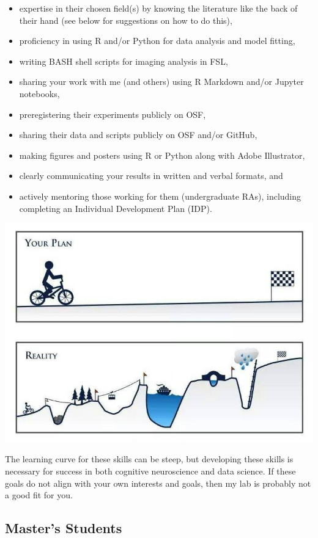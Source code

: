 \documentclass[
]{book}
\providecommand{\tightlist}{%
  \setlength{\itemsep}{0pt}\setlength{\parskip}{0pt}}
\begin{document}
\begin{itemize}
\tightlist
\item
  expertise in their chosen field(s) by knowing the literature like the back of their hand (see below for suggestions on how to do this),
\item
  proficiency in using R and/or Python for data analysis and model fitting,
\item
  writing BASH shell scripts for imaging analysis in FSL,
\item
  sharing your work with me (and others) using R Markdown and/or Jupyter notebooks,
\item
  preregistering their experiments publicly on OSF,
\item
  sharing their data and scripts publicly on OSF and/or GitHub,
\item
  making figures and posters using R or Python along with Adobe Illustrator,
\item
  clearly communicating your results in written and verbal formats, and
\item
  actively mentoring those working for them (undergraduate RAs), including completing an Individual Development Plan (IDP).
\end{itemize}

\includegraphics{images/phdplan.jpg}

The learning curve for these skills can be steep, but developing these skills is necessary for success in both cognitive neuroscience and data science. If these goals do not align with your own interests and goals, then my lab is probably not a good fit for you.

\hypertarget{masters-students}{%
\subsection{Master's Students}\label{masters-students}}
\end{document}
